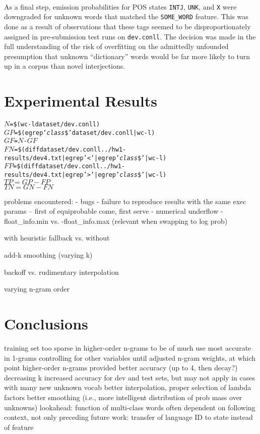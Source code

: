 \documentclass[11pt,a4paper]{article}
\begin{document}
\paragraph{}
As a final step, emission probabilities for POS states \texttt{INTJ}, \texttt{UNK},
and \texttt{X} were downgraded for unknown words that matched the \texttt{SOME\_WORD}
feature. This was done as a result of observations that these tags seemed to be
disproportionately assigned in pre-submission test runs on \texttt{dev.conll}.
The decision was made in the full understanding of the risk of overfitting on the
admittedly unfounded presumption that unknown ``dictionary'' words would be far more
likely to turn up in a corpus than novel interjections.

\section{Experimental Results}

\begin{alltt}
  $N$ = \$(wc -l dataset/dev.conll)
  $GP$ = \$(egrep '\emph{class}\$' dataset/dev.conll | wc -l)
  $GF$ = $N$ - $GF$
  $FN$ = \$(diff dataset/dev.conll ../hw1-results/dev4.txt | egrep '<' | egrep '\emph{class}\$' | wc -l)
  $FP$ = \$(diff dataset/dev.conll ../hw1-results/dev4.txt | egrep '>' | egrep '\emph{class}\$' | wc -l)
  $TP = GP - FP$
  $TN = GN - FN$
\end{alltt}

problems encountered:
- bugs
- failure to reproduce results with the same exec params
-- first of equiprobable come, first serve
- numerical underflow
- float\_info.min vs. -float\_info.max (relevant when swapping to log prob)

with heuristic fallback vs. without

add-k smoothing (varying k)

backoff vs. rudimentary interpolation

varying n-gram order

\section{Conclusions}

training set too sparse in higher-order n-grams to be of much use
most accurate in 1-grams controlling for other variables until adjusted n-gram weights, at which point higher-order n-grams provided better accuracy (up to 4, then decay?)
decreasing k increased accuracy for dev and test sets, but may not apply in cases with many new unknown vocab
better interpolation, proper selection of lambda factors
better smoothing (i.e., more intelligent distribution of prob mass over unknowns)
lookahead: function of multi-class words often dependent on following context, not only preceding
future work: transfer of language ID to state instead of feature
\end{document}
